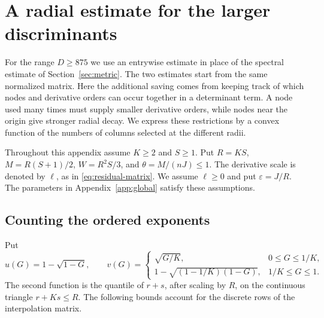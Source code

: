 \section{A radial estimate for the larger discriminants}\label{app:radial}
For the range $D\geq875$ we use an entrywise estimate in place of the
spectral estimate of Section~\ref{sec:metric}. The two estimates start from
the same normalized matrix. Here the additional saving comes from keeping
track of which nodes and derivative orders can occur together in a
determinant term. A node used many times must supply smaller derivative
orders, while nodes near the origin give stronger radial decay. We express
these restrictions by a convex function of the numbers of columns selected
at the different radii.

Throughout this appendix assume $K\geq2$ and $S\geq1$. Put $R=KS$, $M=R(S+1)/2$, $W=R^2S/3$, and
$\theta=M/(nJ)\leq1$. The derivative scale is denoted by $\ell$, as in
\eqref{eq:residual-matrix}. We assume $\ell\geq0$ and put
$\varepsilon=J/R$. The parameters in Appendix~\ref{app:global} satisfy
these assumptions.

\subsection{Counting the ordered exponents}
Put
\[
 u(G)=1-\sqrt{1-G},\qquad
 v(G)=\begin{cases}
 \sqrt{G/K},&0\leq G\leq1/K,\\
 1-\sqrt{(1-1/K)(1-G)},&1/K\leq G\leq1.
 \end{cases}
\]
The second function is the quantile of $r+s$, after scaling by $R$, on
the continuous triangle $r+Ks\leq R$. The following bounds account for
the discrete rows of the interpolation matrix.


